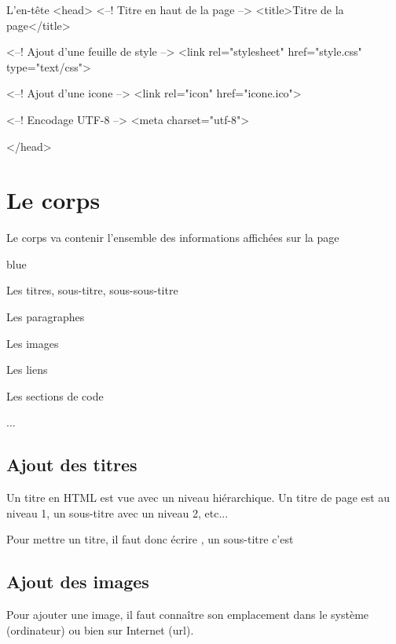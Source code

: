 {\begin{Html}{L'en-tête}
<head>
        <--! Titre en haut de la page -->
        <title>Titre de la page</title> 

        <--! Ajout d'une feuille de style -->
        <link rel="stylesheet" href="style.css" type="text/css"> 

        <--! Ajout d'une icone -->
        <link rel="icon" href="icone.ico">  
        
        <--! Encodage UTF-8 -->
        <meta charset="utf-8">  

</head>
    \end{Html}



\section{Le corps}

Le corps va contenir l'ensemble des informations affichées sur la page
    
\begin{items}{blue}{\Triangle}
    \item Les titres, sous-titre, sous-sous-titre
    \item Les paragraphes 
    \item Les images
    \item Les liens
    \item Les sections de code
    \item ...
\end{items}
    
    
\subsection{Ajout des titres}

Un titre en HTML est vue avec un niveau hiérarchique. 
Un titre de page est au niveau 1, un sous-titre avec un niveau 2, etc...

Pour mettre un titre, il faut donc écrire , un sous-titre 
c'est \\


\subsection{Ajout des images}

Pour ajouter une image, il faut connaître son emplacement dans le système (ordinateur) ou bien sur Internet (url).

}
